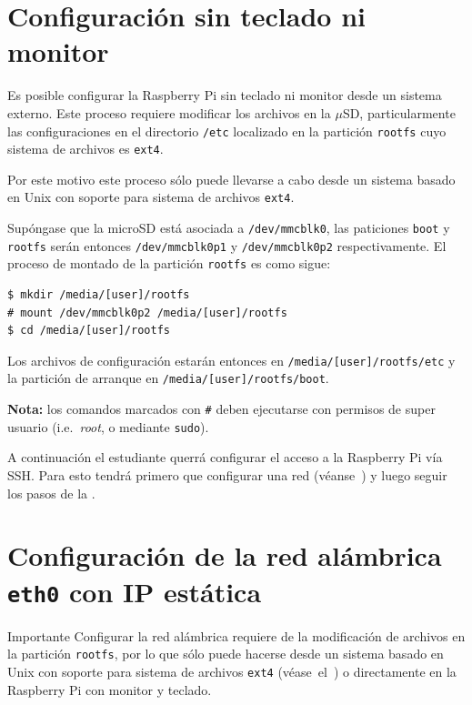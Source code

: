 \documentclass[letterpaper,10.5pt]{article}
\begin{document}
\cleardoublepage{}

%
%
\appendix%
\section{Configuración sin teclado ni monitor}%
\label{sec:setup-headless}
Es posible configurar la Raspberry Pi sin teclado ni monitor desde un sistema externo.
Este proceso requiere modificar los archivos en la $\mu{}$SD, particularmente las configuraciones en el directorio \texttt{/etc} localizado en la partición \texttt{rootfs} cuyo sistema de archivos es \texttt{ext4}.

Por este motivo este proceso sólo puede llevarse a cabo desde un sistema basado en Unix con soporte para sistema de archivos \texttt{ext4}.

Supóngase que la microSD está asociada a \texttt{/dev/mmcblk0}, las paticiones \texttt{boot} y \texttt{rootfs} serán entonces \texttt{/dev/mmcblk0p1} y \texttt{/dev/mmcblk0p2} respectivamente.
El proceso de montado de la partición \texttt{rootfs} es como sigue:

\begin{Verbatim}[fontsize=\footnotesize]
$ mkdir /media/[user]/rootfs
# mount /dev/mmcblk0p2 /media/[user]/rootfs
$ cd /media/[user]/rootfs
\end{Verbatim}

Los archivos de configuración estarán entonces en
	\texttt{/media/[user]/rootfs/etc}
y la partición de arranque en
	\texttt{/media/[user]/rootfs/boot}.

\noindent
\textbf{Nota:} los comandos marcados con \texttt{\#} deben ejecutarse con permisos de super usuario (i.e.~\emph{root}, o mediante \texttt{sudo}).

A continuación el estudiante querrá configurar el acceso a la Raspberry Pi vía SSH. %
Para esto tendrá primero que configurar una red (véanse~) y luego seguir los pasos de la .



\section{Configuración de la red alámbrica \texttt{eth0} con IP estática}%
\label{sec:setup-eth0}
\begin{importantbox}{Importante}
Configurar la red alámbrica requiere de la modificación de archivos en la partición \texttt{rootfs}, por lo que sólo puede hacerse desde un sistema basado en Unix con soporte para sistema de archivos \texttt{ext4} (véase~el~) o directamente en la Raspberry Pi con monitor y teclado.
\end{importantbox}
\end{document}
